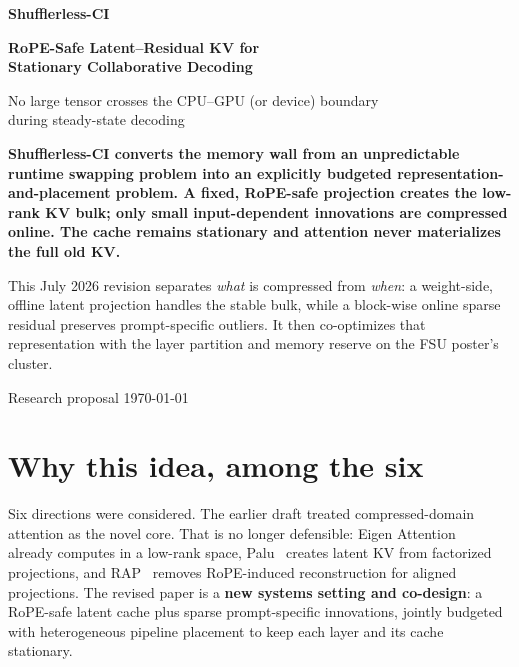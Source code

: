 \documentclass[11pt]{article}
\newcommand{\term}[1]{\textbf{\color{accent!85!black}#1}}
\begin{document}
\begin{titlepage}
\centering
\vspace*{1.6cm}
{\Huge\bfseries\color{accent} Shufflerless-CI\par}
\vspace{0.4cm}
{\Large\bfseries\color{accent} RoPE-Safe Latent--Residual KV for\\ Stationary Collaborative Decoding\par}
\vspace{0.5cm}
{\large No large tensor crosses the CPU--GPU (or device) boundary\\ during steady-state decoding\par}
\vspace{1.4cm}
\begin{tcolorbox}[colback=accent3!8,colframe=accent3,width=0.92\textwidth,arc=3pt]
\centering\bfseries
Shufflerless-CI converts the memory wall from an unpredictable runtime swapping problem into
an explicitly budgeted representation-and-placement problem. A fixed, RoPE-safe projection
creates the low-rank KV bulk; only small input-dependent innovations are compressed online.
The cache remains stationary and attention never materializes the full old KV.
\end{tcolorbox}
\vspace{1.0cm}
\begin{tcolorbox}[colback=softgray,colframe=accent,width=0.92\textwidth,arc=3pt]
\centering
This July 2026 revision separates \emph{what} is compressed from \emph{when}: a
weight-side, offline latent projection handles the stable bulk, while a block-wise online
sparse residual preserves prompt-specific outliers. It then co-optimizes that representation
with the layer partition and memory reserve on the FSU poster's cluster.
\end{tcolorbox}
\vfill
{\normalsize Research proposal \;\textbullet\; \today\par}
\end{titlepage}

\tableofcontents
\newpage

\section{Why this idea, among the six}
\label{sec:select}

Six directions were considered. The earlier draft treated compressed-domain attention as the
novel core. That is no longer defensible: Eigen Attention~\cite{eigenattention} already
computes in a low-rank space, Palu~\cite{palu} creates latent KV from factorized projections,
and RAP~\cite{rap} removes RoPE-induced reconstruction for aligned projections. The revised
paper is a \term{new systems setting and co-design}: a RoPE-safe latent cache plus sparse
prompt-specific innovations, jointly budgeted with heterogeneous pipeline placement to keep
each layer and its cache stationary.
\end{document}
